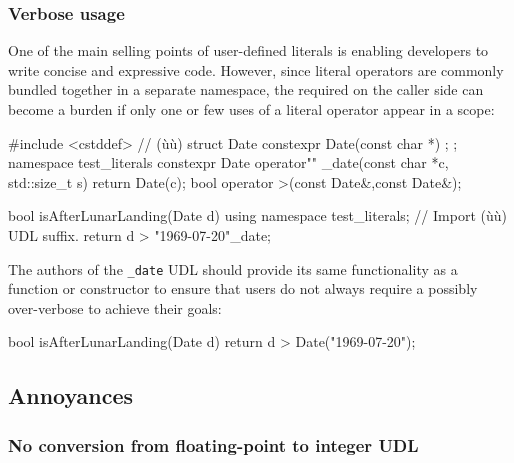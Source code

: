 \subsubsection[Verbose usage]{Verbose usage}

One of the main selling points of user-defined literals is enabling developers to write concise and expressive code. However, since literal operators are commonly bundled together in a separate namespace, the required  on the caller side can become a burden if only one or few uses of a literal operator appear in a scope:

\begin{emcppshiddenlisting}[emcppsbatch={e23,e24}]
#include <cstddef>  // (ù{}ù)
struct Date {
constexpr Date(const char *) {};
};
namespace test_literals {
constexpr Date operator"" _date(const char *c, std::size_t s) { return Date(c); }
}
bool operator >(const Date&,const Date&);
\end{emcppshiddenlisting}
\begin{emcppslisting}[emcppsbatch=e23]
bool isAfterLunarLanding(Date d)
{
    using namespace test_literals;  // Import (ù{}ù) UDL suffix.
    return d > "1969-07-20"_date;
}
\end{emcppslisting}

\noindent The authors of the \lstinline!_date! UDL should provide its same functionality as a function or constructor to ensure that users do not always require a possibly over-verbose  to achieve their goals:

\begin{emcppslisting}[emcppsbatch=e24]
bool isAfterLunarLanding(Date d)
{
    return d > Date("1969-07-20");
}
\end{emcppslisting}



\subsection[Annoyances]{Annoyances}\label{annoyances}

\subsubsection[No conversion from floating-point to integer \lstinline!UDL!]{No conversion from floating-point to integer {\SubsubsecCode UDL}}\label{no-conversion-from-floating-point-to-integer-udl}


